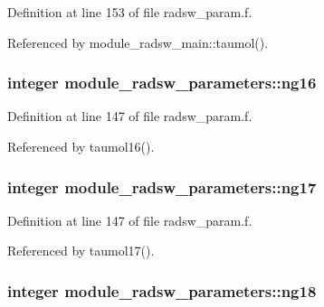 Definition at line 153 of file radsw\+\_\+param.\+f.



Referenced by module\+\_\+radsw\+\_\+main\+::taumol().

\subsubsection[{\texorpdfstring{ng16}{ng16}}]{\setlength{\rightskip}{0pt plus 5cm}integer module\+\_\+radsw\+\_\+parameters\+::ng16}\hypertarget{namespacemodule__radsw__parameters_a442b3758f00a388cd8b7129ba910942a}{}\label{namespacemodule__radsw__parameters_a442b3758f00a388cd8b7129ba910942a}


Definition at line 147 of file radsw\+\_\+param.\+f.



Referenced by taumol16().

\subsubsection[{\texorpdfstring{ng17}{ng17}}]{\setlength{\rightskip}{0pt plus 5cm}integer module\+\_\+radsw\+\_\+parameters\+::ng17}\hypertarget{namespacemodule__radsw__parameters_af1f90ffe5780463d1e2edbe0e8dfd1f9}{}\label{namespacemodule__radsw__parameters_af1f90ffe5780463d1e2edbe0e8dfd1f9}


Definition at line 147 of file radsw\+\_\+param.\+f.



Referenced by taumol17().

\subsubsection[{\texorpdfstring{ng18}{ng18}}]{\setlength{\rightskip}{0pt plus 5cm}integer module\+\_\+radsw\+\_\+parameters\+::ng18}\hypertarget{namespacemodule__radsw__parameters_ac00a8e59e4f7e584af9b453c2c9fe35d}{}\label{namespacemodule__radsw__parameters_ac00a8e59e4f7e584af9b453c2c9fe35d}


